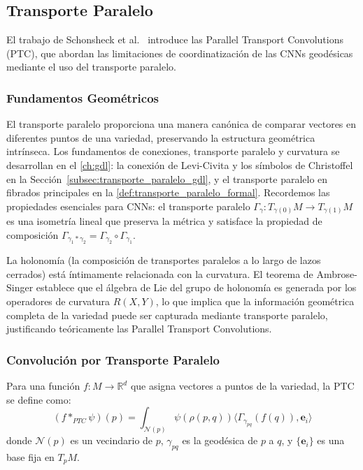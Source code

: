 \subsection{Transporte Paralelo}\label{subsec:transporte_paralelo}

El trabajo de Schonsheck et al.~\citep{schonsheck2018parallel} introduce las Parallel Transport Convolutions (PTC), que abordan las limitaciones de coordinatización de las CNNs geodésicas mediante el uso del transporte paralelo.

\subsubsection{Fundamentos Geométricos}

El transporte paralelo proporciona una manera canónica de comparar vectores en diferentes puntos de una variedad, preservando la estructura geométrica intrínseca. Los fundamentos de conexiones, transporte paralelo y curvatura se desarrollan en el \autoref{ch:gdl}: la conexión de Levi-Civita y los símbolos de Christoffel en la Sección~\ref{subsec:transporte_paralelo_gdl}, y el transporte paralelo en fibrados principales en la \autoref{def:transporte_paralelo_formal}. Recordemos las propiedades esenciales para CNNs: el transporte paralelo $\Gamma_\gamma: T_{\gamma(0)}M \to T_{\gamma(1)}M$ es una isometría lineal que preserva la métrica y satisface la propiedad de composición $\Gamma_{\gamma_1 * \gamma_2} = \Gamma_{\gamma_2} \circ \Gamma_{\gamma_1}$.

La holonomía (la composición de transportes paralelos a lo largo de lazos cerrados) está íntimamente relacionada con la curvatura. El teorema de Ambrose-Singer establece que el álgebra de Lie del grupo de holonomía es generada por los operadores de curvatura $R(X,Y)$, lo que implica que la información geométrica completa de la variedad puede ser capturada mediante transporte paralelo, justificando teóricamente las Parallel Transport Convolutions.

\subsubsection{Convolución por Transporte Paralelo}

\begin{definition}[PTC]
Para una función $f: M \to \mathbb{R}^d$ que asigna vectores a puntos de la variedad, la PTC se define como:
\begin{equation}
(f *_{PTC} \psi)(p) = \int_{\mathcal{N}(p)} \psi(\rho(p,q)) \langle \Gamma_{\gamma_{pq}}(f(q)), \mathbf{e}_i \rangle
\end{equation}
donde $\mathcal{N}(p)$ es un vecindario de $p$, $\gamma_{pq}$ es la geodésica de $p$ a $q$, y $\{\mathbf{e}_i\}$ es una base fija en $T_p M$.
\end{definition}

